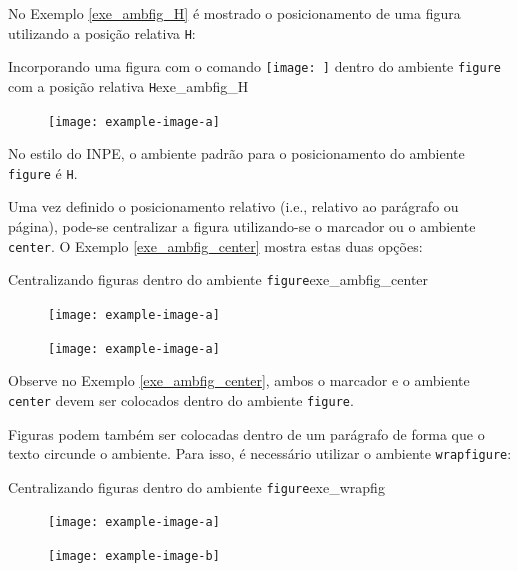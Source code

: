 No Exemplo \ref{exe_ambfig_H} é mostrado o posicionamento de uma figura utilizando a posição relativa {\tt H}:

\begin{texexptitled}[breakable,enhanced,middle=2mm]{Incorporando uma figura com o comando \texttt{\texttt{[image: ]}} dentro do ambiente {\tt figure} com a posição relativa {\tt H}}{exe_ambfig_H}
\lipsum[1]
\begin{figure}[H]
\texttt{[image: example-image-a]}
\end{figure}
\lipsum[2]
\end{texexptitled}

\begin{marker}
  No estilo do INPE, o ambiente padrão para o posicionamento do ambiente {\tt figure} é {\tt H}.
\end{marker}

Uma vez definido o posicionamento relativo (i.e., relativo ao parágrafo ou página), pode-se centralizar a figura utilizando-se o marcador \texttt{\centering} ou o ambiente {\tt center}. O Exemplo \ref{exe_ambfig_center} mostra estas duas opções:

\begin{texexptitled}[breakable,enhanced,middle=2mm]{Centralizando figuras dentro do ambiente {\tt figure}}{exe_ambfig_center}
\lipsum[1]
\begin{figure}[H]
\centering
\texttt{[image: example-image-a]}
\end{figure}
\lipsum[2]
\begin{figure}[H]
    \begin{center}
        \texttt{[image: example-image-a]}
    \end{center}
\end{figure}
\end{texexptitled}

Observe no Exemplo \ref{exe_ambfig_center}, ambos o marcador \texttt{\centering} e o ambiente {\tt center} devem ser colocados dentro do ambiente {\tt figure}.

Figuras podem também ser colocadas dentro de um parágrafo de forma que o texto circunde o ambiente. Para isso, é necessário utilizar o ambiente {\tt wrapfigure}:

\begin{texexptitled}[enhanced,middle=2mm]{Centralizando figuras dentro do ambiente {\tt figure}}{exe_wrapfig}
\begin{figure}
    \centering
    \texttt{[image: example-image-a]}
\end{figure}
\lipsum[2]

\begin{figure}
    \centering
    \texttt{[image: example-image-b]}
\end{figure}
\lipsum[3]
\end{texexptitled}

